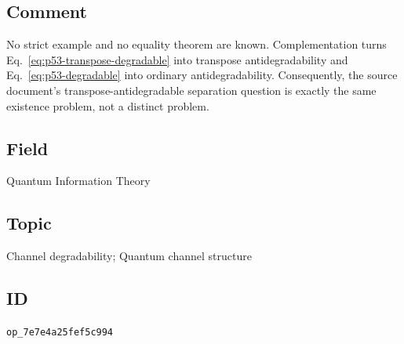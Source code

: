 \subsection*{Comment}

No strict example and no equality theorem are known.  Complementation turns
Eq.~\eqref{eq:p53-transpose-degradable} into transpose antidegradability and
Eq.~\eqref{eq:p53-degradable} into ordinary antidegradability.  Consequently,
the source document's transpose-antidegradable separation question is exactly
the same existence problem, not a distinct problem.

\subsection*{Field}

Quantum Information Theory

\subsection*{Topic}

Channel degradability; Quantum channel structure

\subsection*{ID}

\texttt{op\_7e7e4a25fef5c994}
